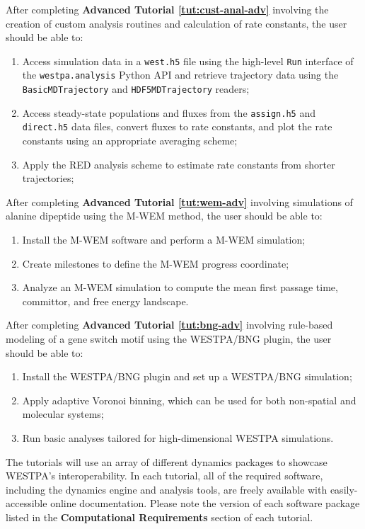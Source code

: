 After completing \textbf{Advanced Tutorial \ref{tut:cust-anal-adv}} involving the creation of custom analysis routines and calculation of rate constants, the user should be able to:
\begin{enumerate}
  \item Access simulation data in a \verb|west.h5| file using the high-level \verb|Run| interface of the \verb|westpa.analysis| Python API and retrieve trajectory data using the \verb|BasicMDTrajectory| and \verb|HDF5MDTrajectory| readers;
  \item Access steady-state populations and fluxes from the \verb|assign.h5| and \verb|direct.h5| data files, convert fluxes to rate constants, and plot the rate constants using an appropriate averaging scheme;
  \item Apply the RED analysis scheme to estimate rate constants from shorter trajectories;
\end{enumerate}

After completing \textbf{Advanced Tutorial \ref{tut:wem-adv}} involving simulations of alanine dipeptide using the M-WEM method, the user should be able to:
\begin{enumerate}
  \item Install the M-WEM software and perform a M-WEM simulation;
  \item Create milestones to define the M-WEM progress coordinate;
  \item Analyze an M-WEM simulation to compute the mean first passage time, committor, and free energy landscape.
\end{enumerate}

After completing \textbf{Advanced Tutorial \ref{tut:bng-adv}} involving rule-based modeling of a gene switch motif using the WESTPA/BNG plugin, the user should be able to:
\begin{enumerate}
  \item Install the WESTPA/BNG plugin and set up a WESTPA/BNG simulation; 
  \item Apply adaptive Voronoi binning, which can be used for both non-spatial and molecular systems; 
  \item Run basic analyses tailored for high-dimensional WESTPA simulations. 
\end{enumerate}

The tutorials will use an array of different dynamics packages to showcase WESTPA’s interoperability. %
%
In each tutorial, all of the required software, including the dynamics engine and analysis tools, are freely available with easily-accessible online documentation.
Please note the version of each software package listed in the \textbf{Computational Requirements} section of each tutorial. 

